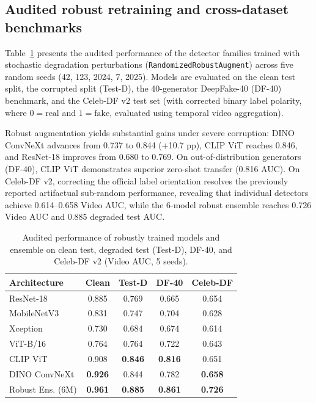 \documentclass[conference,10pt,letterpaper]{IEEEtran}
\begin{document}
\subsection{Audited robust retraining and cross-dataset benchmarks}
Table~\ref{tab:robust_results} presents the audited performance of the detector families trained with stochastic degradation perturbations (\texttt{RandomizedRobustAugment}) across five random seeds (42, 123, 2024, 7, 2025). Models are evaluated on the clean test split, the corrupted split (Test-D), the 40-generator DeepFake-40 (DF-40) benchmark, and the Celeb-DF v2 test set (with corrected binary label polarity, where $0=\text{real}$ and $1=\text{fake}$, evaluated using temporal video aggregation).

Robust augmentation yields substantial gains under severe corruption: DINO ConvNeXt advances from 0.737 to 0.844 (+10.7 pp), CLIP ViT reaches 0.846, and ResNet-18 improves from 0.680 to 0.769. On out-of-distribution generators (DF-40), CLIP ViT demonstrates superior zero-shot transfer (0.816 AUC). On Celeb-DF v2, correcting the official label orientation resolves the previously reported artifactual sub-random performance, revealing that individual detectors achieve 0.614--0.658 Video AUC, while the 6-model robust ensemble reaches 0.726 Video AUC and 0.885 degraded test AUC.

\begin{table}[t]
\caption{Audited performance of robustly trained models and ensemble on clean test, degraded test (Test-D), DF-40, and Celeb-DF v2 (Video AUC, 5 seeds).}
\label{tab:robust_results}
\centering\small
\begin{tabular}{lcccc}
\toprule
Architecture & Clean & Test-D & DF-40 & Celeb-DF\\
\midrule
ResNet-18 & 0.885 & 0.769 & 0.665 & 0.654\\
MobileNetV3 & 0.831 & 0.747 & 0.704 & 0.628\\
Xception & 0.730 & 0.684 & 0.674 & 0.614\\
ViT-B/16 & 0.764 & 0.764 & 0.722 & 0.643\\
CLIP ViT & 0.908 & \textbf{0.846} & \textbf{0.816} & 0.651\\
DINO ConvNeXt & \textbf{0.926} & 0.844 & 0.782 & \textbf{0.658}\\
\midrule
Robust Ens. (6M) & \textbf{0.961} & \textbf{0.885} & \textbf{0.861} & \textbf{0.726}\\
\bottomrule
\end{tabular}
\end{table}
\end{document}
